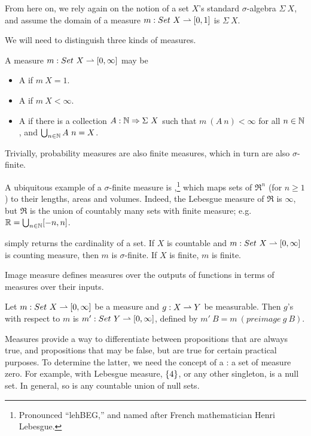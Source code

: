 From here on, we rely again on the notion of a set $X$'s standard $\sigma$-algebra $\Sigma~X$, and assume the domain of a measure $m : Set~X \rightharpoonup [0,1]$ is $\Sigma~X$.

We will need to distinguish three kinds of measures.

\begin{definition}
A measure $m : Set~X \rightharpoonup [0,\infty]$ may be
\begin{itemize}
	\item A  if $m~X = 1$.
	\item A  if $m~X < \infty$.
	\item A  if there is a collection $A : \mathbb{N} \Rightarrow \Sigma~X$ such that $m~(A~n) < \infty$ for all $n \in \mathbb{N}$, and $\bigcup_{n \in \mathbb{N}} A~n = X$.
\end{itemize}
Trivially, probability measures are also finite measures, which in turn are also $\sigma$-finite.
\end{definition}

A ubiquitous example of a $\sigma$-finite measure is ,\footnote{Pronounced ``lehBEG,'' and named after French mathematician Henri Lebesgue.} which maps sets of $\Re^n$ (for $n \ge 1$) to their lengths, areas and volumes.
Indeed, the Lebesgue measure of $\Re$ is $\infty$, but $\Re$ is the union of countably many sets with finite measure; e.g. $\mathbb{R} = \bigcup_{n \in \mathbb{N}} [-n,n]$.

 simply returns the cardinality of a set.
If $X$ is countable and $m : Set~X \rightharpoonup [0,\infty]$ is counting measure, then $m$ is $\sigma$-finite.
If $X$ is finite, $m$ is finite.

Image measure defines measures over the outputs of functions in terms of measures over their inputs.

\begin{definition}
Let $m : Set~X \rightharpoonup [0,\infty]$ be a measure and $g : X \rightharpoonup Y$ be measurable.
Then $g$'s  with respect to $m$ is $m' : Set~Y \rightharpoonup [0,\infty]$, defined by $m'~B = m~(preimage~g~B)$.
\end{definition}

Measures provide a way to differentiate between propositions that are always true, and propositions that may be false, but are true for certain practical purposes.
To determine the latter, we need the concept of a : a set of measure zero.
For example, with Lebesgue measure, $\{{4}\}$, or any other singleton, is a null set.
In general, so is any countable union of null sets.

